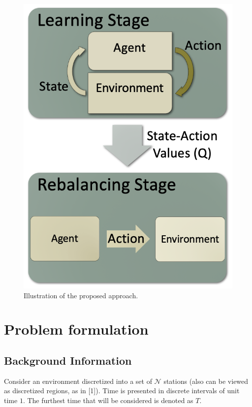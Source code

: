 \documentclass[letterpaper, 10 pt, conference]{ieeeconf}  %
\begin{document}
\begin{figure}[thpb]
      \centering
      \includegraphics[scale=0.7]{procedure.png}
      \caption{Illustration of the proposed approach.}
      \label{figurelabel}
\end{figure}

\section{Problem formulation}
\subsection{Background Information}
Consider an environment discretized into a set of $\mathcal{N}$ stations (also can be viewed as discretized regions, as in [1]). Time is presented in discrete intervals of unit time $1$. The furthest time that will be considered is denoted as $T$.
\end{document}
